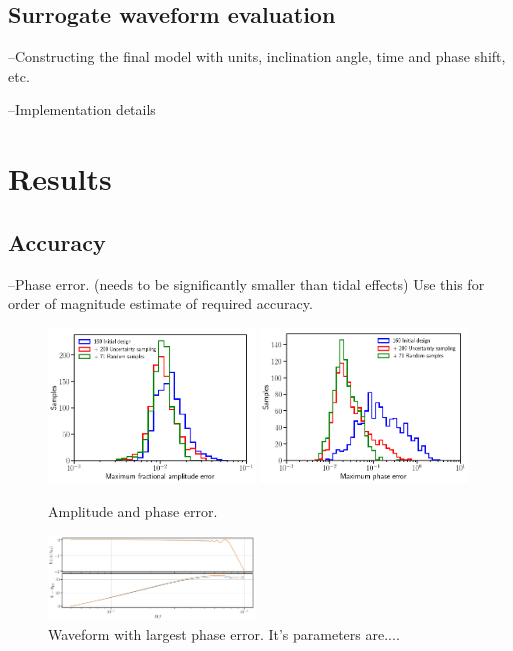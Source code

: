 \documentclass[prd,aps,letter,twocolumn,floatfix,notitlepage,nofootinbib]{revtex4-1}
\begin{document}
\subsection{Surrogate waveform evaluation}

--Constructing the final model with units, inclination angle, time and phase shift, etc.

--Implementation details


\section{Results}

\subsection{Accuracy}

--Phase error. (needs to be significantly smaller than tidal effects) Use this for order of magnitude estimate of required
accuracy.

\begin{figure}[htb]
\centering
\includegraphics[width=0.49\textwidth]{maxamphist.png}
\includegraphics[width=0.49\textwidth]{maxphasehist.png}
\caption{Amplitude and phase error.}
\label{fig:phaserange}
\end{figure}

\begin{figure}[htb]
\centering
\includegraphics[width=0.49\textwidth]{dhmaxerror.png}
\caption{Waveform with largest phase error. It's parameters are....}
\label{fig:phaserange}
\end{figure}
\end{document}
